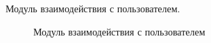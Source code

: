 Модуль взаимодействия с пользователем.

\begin{figure}[h]
\caption{Модуль взаимодействия с пользователем}
\label{package_diagram_interaction}
\end{figure}